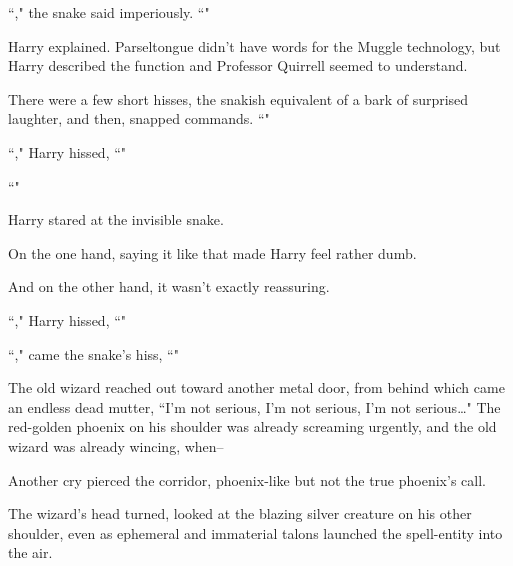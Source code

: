 ``," the snake said imperiously. ``"

Harry explained. Parseltongue didn't have words for the Muggle technology, but Harry described the function and Professor Quirrell seemed to understand.

There were a few short hisses, the snakish equivalent of a bark of surprised laughter, and then, snapped commands. ``"

``," Harry hissed, ``"

``"

Harry stared at the invisible snake.

On the one hand, saying it like that made Harry feel rather dumb.

And on the other hand, it wasn't exactly reassuring.

``," Harry hissed, ``"

``," came the snake's hiss, ``"

\later

The old wizard reached out toward another metal door, from behind which came an endless dead mutter, ``I'm not serious, I'm not serious, I'm not serious{\ldots}" The red-golden phoenix on his shoulder was already screaming urgently, and the old wizard was already wincing, when\---

Another cry pierced the corridor, phoenix-like but not the true phoenix's call.

The wizard's head turned, looked at the blazing silver creature on his other shoulder, even as ephemeral and immaterial talons launched the spell-entity into the air.

